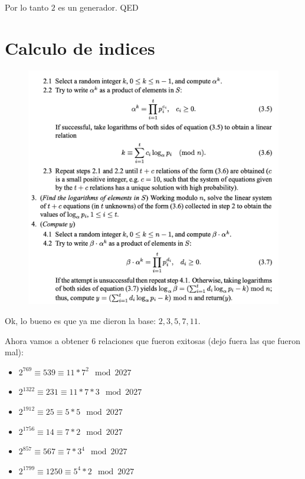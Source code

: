 \documentclass[12pt, fleqn]{report}                             %
\theoremstyle{break}                                            %
\begin{document}
    Por lo tanto $2$ es un generador. QED


  \clearpage
  \section{Calculo de indices}

    \begin{figure}[h]
      \includegraphics[width=\textwidth]{Gammal4}
      \caption{\cite{Menezes}}
    \end{figure}

    Ok, lo bueno es que ya me dieron la base: $2, 3, 5, 7, 11$.


    Ahora vamos a obtener 6 relaciones que fueron exitosas (dejo fuera las que fueron mal):
    \begin{itemize}
      \item $2^{769} \equiv 539 \equiv 11 * 7^2 \mod{2027}$
      \item $2^{1322} \equiv 231 \equiv 11 * 7 * 3 \mod{2027}$
      
      \item $2^{1912} \equiv 25 \equiv 5 * 5 \mod{2027}$
      \item $2^{1756} \equiv 14 \equiv 7 * 2 \mod{2027}$
       
      \item $2^{857} \equiv 567 \equiv 7 * 3^4 \mod{2027}$
      \item $2^{1799} \equiv 1250 \equiv 5^4 * 2 \mod{2027}$
    \end{itemize}
\end{document}
